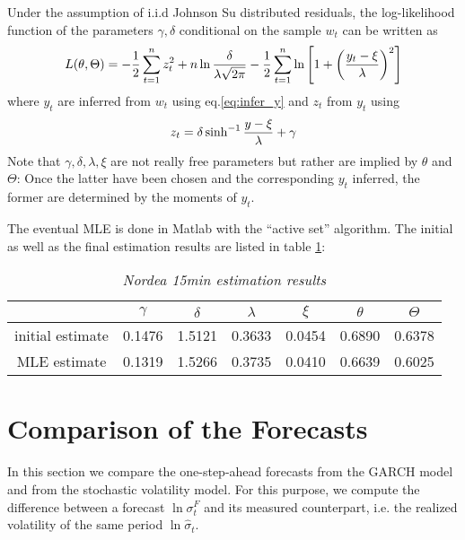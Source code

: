 Under the assumption of i.i.d Johnson Su distributed residuals, the
log-likelihood function of the parameters $\gamma, \delta$
conditional on the sample $w_t$ can be written as
\[
L(\theta, \Theta) = -{1 \over 2}\sum_{t=1}^n z_t^2 + n \ln{\delta
  \over \lambda \sqrt{2\pi}} - {1 \over 2}\sum_{t=1}^n \ln\left[
  1 + \left({y_t - \xi \over \lambda}\right)^2
\right]
\]
where $y_t$ are inferred from $w_t$ using eq.\ref{eq:infer_y}
and $z_t$ from $y_t$ using
\[
z_t = \delta \sinh^{-1}{y - \xi \over \lambda} + \gamma
\]
Note that $\gamma, \delta, \lambda, \xi$ are not really free
parameters but rather are implied by $\theta$ and $\Theta$: Once the
latter have been chosen and the corresponding $y_t$ inferred, the
former are determined by the moments of $y_t$.

The eventual MLE is done in Matlab with the ``active set''
algorithm. The initial as well as the final estimation results are
listed in table \ref{tab:nordea_15min_js_param}:
\begin{table}[htb!]
  \centering
  \begin{tabular}{|c|c|c|c|c|c|c|}
    \hline
    & $\gamma$ & $\delta$ & $\lambda$ & $\xi$ & $\theta$ & $\Theta$ \\
    \hline
    initial estimate & 0.1476 & 1.5121 & 0.3633 & 0.0454 & 0.6890 &
    0.6378 \\
    \hline
    MLE estimate & 0.1319 & 1.5266 & 0.3735 & 0.0410 & 0.6639 & 0.6025
    \\
    \hline
  \end{tabular}
  \caption{\small \it Nordea 15min estimation results}
  \label{tab:nordea_15min_js_param}
\end{table}

\section{Comparison of the Forecasts}
In this section we compare the one-step-ahead forecasts from the GARCH
model and from the stochastic volatility model. For this purpose, we
compute the difference between a forecast $\ln \sigma^F_t$ and its measured
counterpart, i.e. the realized volatility of the same period $\ln
\hat{\sigma}_t$.

